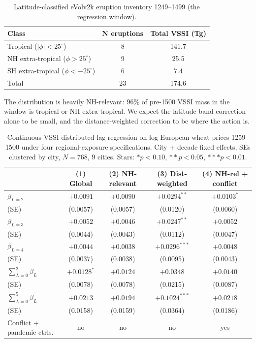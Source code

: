 \documentclass[11pt,letterpaper]{article}
\begin{document}
\begin{table}[H]
\centering
\caption{Latitude-classified eVolv2k eruption inventory 1249--1499 (the regression window).}
\label{tab:lat-inventory}
\small
\begin{tabular}{lcc}
\toprule
Class & N eruptions & Total VSSI (Tg) \\
\midrule
Tropical ($|\phi|<25^\circ$)              & 8  & 141.7 \\
NH extra-tropical ($\phi>25^\circ$)        & 9  & 25.5 \\
SH extra-tropical ($\phi<-25^\circ$)       & 6  & 7.4 \\
\midrule
Total                                       & 23 & 174.6 \\
\bottomrule
\end{tabular}
\end{table}

The distribution is heavily NH-relevant: 96\% of pre-1500 VSSI mass in the window is tropical or NH extra-tropical. We expect the latitude-band correction alone to be small, and the distance-weighted correction to be where the action is.

\begin{table}[H]
\centering
\caption{Continuous-VSSI distributed-lag regression on log European wheat prices 1259--1500 under four regional-exposure specifications. City + decade fixed effects, SEs clustered by city, $N=768$, 9 cities. Stars: $* p<0.10$, $** p<0.05$, $*** p<0.01$.}
\label{tab:volcanic-regional}
\footnotesize
\begin{tabular}{lcccc}
\toprule
 & (1) Global & (2) NH-relevant & (3) Dist-weighted & (4) NH-rel + conflict \\
\midrule
$\beta_{L=2}$           & $+0.0091$ & $+0.0090$ & $+0.0294^{**}$ & $+0.0103^{*}$ \\
\quad (SE)              & (0.0057)      & (0.0057)      & (0.0120)        & (0.0060)      \\
$\beta_{L=3}$           & $+0.0052$     & $+0.0046$     & $+0.0247^{**}$  & $+0.0052$     \\
\quad (SE)              & (0.0044)      & (0.0043)      & (0.0112)        & (0.0047)      \\
$\beta_{L=4}$           & $+0.0044$     & $+0.0038$     & $+0.0296^{***}$ & $+0.0048$     \\
\quad (SE)              & (0.0037)      & (0.0038)      & (0.0095)        & (0.0043)      \\
\midrule
$\sum_{L=0}^{2} \beta_L$  & $+0.0128^{*}$ & $+0.0124$    & $+0.0348$       & $+0.0140$    \\
\quad (SE)              & (0.0078)      & (0.0078)      & (0.0215)        & (0.0087)      \\
$\sum_{L=0}^{5} \beta_L$  & $+0.0213$     & $+0.0194$    & $+0.1024^{***}$ & $+0.0218$    \\
\quad (SE)              & (0.0158)      & (0.0159)      & (0.0364)        & (0.0186)      \\
\midrule
Conflict + pandemic ctrls. & no         & no            & no               & yes           \\
\bottomrule
\end{tabular}
\end{table}
\end{document}
